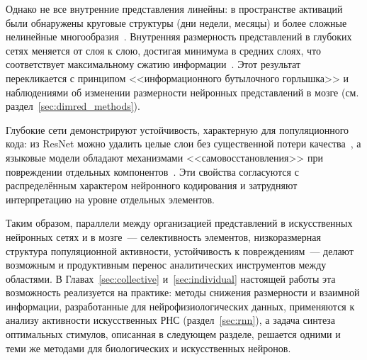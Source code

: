Однако не все внутренние представления линейны: в пространстве активаций были обнаружены круговые структуры (дни недели, месяцы) и более сложные нелинейные многообразия~\cite{Engels2024nonlinear}. Внутренняя размерность представлений в глубоких сетях меняется от слоя к слою, достигая минимума в средних слоях, что соответствует максимальному сжатию информации~\cite{Ansuini2019}. Этот результат перекликается с принципом <<информационного бутылочного горлышка>> и наблюдениями об изменении размерности нейронных представлений в мозге (см. раздел~\ref{sec:dimred_methods}).

Глубокие сети демонстрируют устойчивость, характерную для популяционного кода: из ResNet можно удалить целые слои без существенной потери качества~\cite{Veit2016residual}, а языковые модели обладают механизмами <<самовосстановления>> при повреждении отдельных компонентов~\cite{McGrath2023hydra}. Эти свойства согласуются с распределённым характером нейронного кодирования и затрудняют интерпретацию на уровне отдельных элементов.

Таким образом, параллели между организацией представлений в искусственных нейронных сетях и в мозге~--- селективность элементов, низкоразмерная структура популяционной активности, устойчивость к повреждениям~--- делают возможным и продуктивным перенос аналитических инструментов между областями. В Главах~\ref{sec:collective} и~\ref{sec:individual} настоящей работы эта возможность реализуется на практике: методы снижения размерности и взаимной информации, разработанные для нейрофизиологических данных, применяются к анализу активности искусственных РНС (раздел~\ref{sec:rnn}), а задача синтеза оптимальных стимулов, описанная в следующем разделе, решается одними и теми же методами для биологических и искусственных нейронов.
